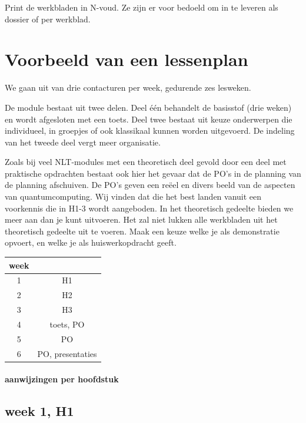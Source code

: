 \documentclass[../../main.tex]{subfiles}
\begin{document}
Print de werkbladen in N-voud. Ze zijn er voor bedoeld om in te leveren als dossier of per werkblad.


\section{Voorbeeld van een lessenplan}\label{sec:lessenplan}
We gaan uit van drie contacturen per week, gedurende zes lesweken. 


De module bestaat uit twee delen. Deel \'e\'en behandelt de basisstof (drie weken) en wordt afgesloten met een toets. Deel twee bestaat uit keuze onderwerpen die individueel, in groepjes of ook klassikaal kunnen worden uitgevoerd. De indeling van het tweede deel vergt meer organisatie.

Zoals bij veel NLT-modules met een theoretisch deel gevold door een deel met praktische opdrachten bestaat ook hier het gevaar dat de PO's in de planning van de planning afschuiven. De PO's geven een re\"eel en divers beeld van de aspecten van quantumcomputing. Wij vinden dat die het best landen vanuit een voorkennis die in H1-3 wordt aangeboden. In het theoretisch gedeelte bieden we meer aan dan je kunt uitvoeren. Het zal niet lukken alle werkbladen uit het theoretisch gedeelte uit te voeren. Maak een keuze welke je als demonstratie opvoert, en welke je als huiswerkopdracht geeft.

\begin{flushleft}
\begin{tabular}{|c|c|}
\hline 
week &   \\ \hline 
1 & H1   \\ \hline 
2 & H2   \\ \hline 
3 & H3   \\ \hline 
4 & toets, PO \\ \hline 
5 & PO   \\ \hline
6 & PO, presentaties \\ \hline 
\end{tabular}

\end{flushleft}

\paragraph*{aanwijzingen per hoofdstuk}

\subsection*{week 1, H1}
\end{document}
